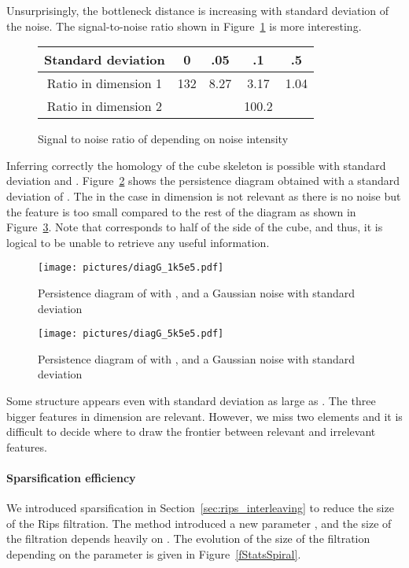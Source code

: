 \documentclass[a4paper]{article}
\begin{document}
Unsurprisingly, the bottleneck distance is increasing with standard deviation of the noise.
The signal-to-noise ratio shown in Figure~\ref{fGaussRatio} is more interesting.

\begin{figure}[!ht]
\centering
\begin{tabular}{|c|c|c|c|c|}
\hline
Standard deviation & 0 & .05 & .1 & .5 \\
\hline
Ratio in dimension 1 & 132 & 8.27 & 3.17 & 1.04 \\
Ratio in dimension 2 &  &  & 100.2 &  \\
\hline
\end{tabular}
\caption{Signal to noise ratio of  depending on noise intensity}\label{fGaussRatio}
\end{figure}

Inferring correctly the homology of the cube skeleton is possible with standard deviation  and .
Figure~\ref{fPersGaus.1} shows the persistence diagram obtained with a standard deviation of .
The  in the  case in dimension  is not relevant as there is no noise but the feature is too small compared to the rest of the diagram as shown in Figure~\ref{fPersGaus.5}.
Note that  corresponds to half of the side of the cube, and thus, it is logical to be unable to retrieve any useful information.

\begin{figure}[!ht]
\centering
\texttt{[image: pictures/diagG\_1k5e5.pdf]}
\caption{Persistence diagram of  with ,  and a Gaussian noise with standard deviation }\label{fPersGaus.1}
\end{figure}

\begin{figure}[!ht]
\centering
\texttt{[image: pictures/diagG\_5k5e5.pdf]}
\caption{Persistence diagram of  with ,  and a Gaussian noise with standard deviation }\label{fPersGaus.5}
\end{figure}

Some structure appears even with standard deviation as large as . 
The three bigger features in dimension  are relevant. 
However, we miss two elements and it is difficult to decide where to draw the frontier between relevant and irrelevant features.

\paragraph{Sparsification efficiency\\}
We introduced sparsification in Section~\ref{sec:rips_interleaving} to reduce the size of the Rips filtration.
The method introduced a new parameter , and  the size of the filtration depends heavily on .
The evolution of the size of the filtration depending on the parameter  is given in Figure~\ref{fStatsSpiral}.
\end{document}
